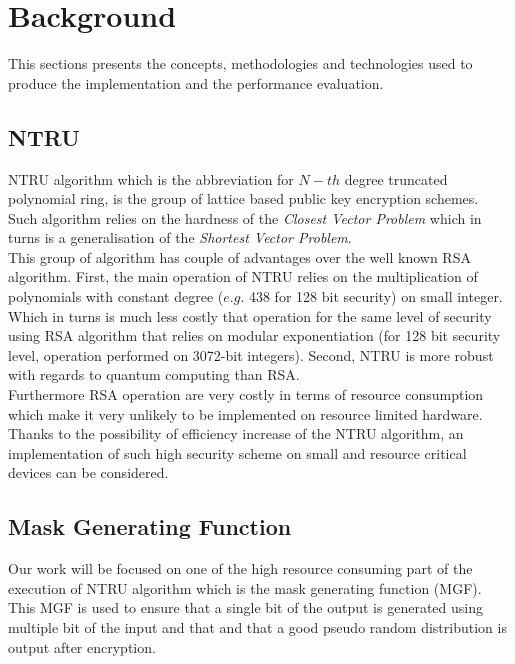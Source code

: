 \section{Background}
\label{sec:background}

This sections presents the concepts, methodologies and technologies used to produce the implementation and the performance evaluation.

\subsection{NTRU}
NTRU algorithm which is the abbreviation for $N-th$ degree truncated polynomial ring, is the group of lattice based public key encryption schemes.\\
Such algorithm relies on the hardness of the \textit{Closest Vector Problem} which in turns is a generalisation of the \textit{Shortest Vector Problem}.\\ %

This group of algorithm has couple of advantages over the well known RSA algorithm. First, the main operation of NTRU relies on the multiplication of polynomials with constant degree ($e.g.$ 438 for 128 bit security) on small integer. Which in turns is much less costly that operation for the same level of security using RSA algorithm that relies on modular exponentiation (for 128 bit security level, operation performed on 3072-bit integers). Second, NTRU is more robust with regards to quantum computing than RSA.\\
Furthermore RSA operation are very costly in terms of resource consumption which make it very unlikely to be implemented on resource limited hardware. Thanks to the possibility of efficiency increase of the NTRU algorithm, an implementation of such high security scheme on small and resource critical devices can be considered.
\subsection{Mask Generating Function}
Our work will be focused on one of the high resource consuming part of the execution of NTRU algorithm which is the mask generating function (MGF). This MGF is used to ensure that a single bit of the output is generated using multiple bit of the input and that and that a good pseudo random distribution is output after encryption.\\

